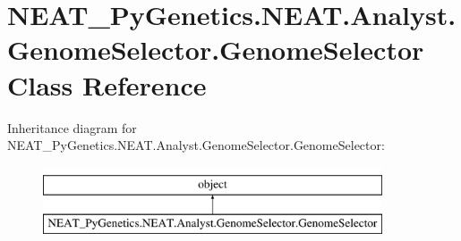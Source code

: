 \hypertarget{classNEAT__PyGenetics_1_1NEAT_1_1Analyst_1_1GenomeSelector_1_1GenomeSelector}{}\section{N\+E\+A\+T\+\_\+\+Py\+Genetics.\+N\+E\+A\+T.\+Analyst.\+Genome\+Selector.\+Genome\+Selector Class Reference}
\label{classNEAT__PyGenetics_1_1NEAT_1_1Analyst_1_1GenomeSelector_1_1GenomeSelector}
Inheritance diagram for N\+E\+A\+T\+\_\+\+Py\+Genetics.\+N\+E\+A\+T.\+Analyst.\+Genome\+Selector.\+Genome\+Selector\+:\begin{figure}[H]
\begin{center}
\leavevmode
\includegraphics[height=2.000000cm]{classNEAT__PyGenetics_1_1NEAT_1_1Analyst_1_1GenomeSelector_1_1GenomeSelector}
\end{center}
\end{figure}
